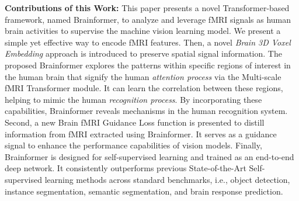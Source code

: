 \noindent
\textbf{Contributions of this Work:} This paper presents a novel Transformer-based framework, named Brainformer, to analyze and leverage fMRI signals as human brain activities to supervise the machine vision learning model. 
We present a simple yet effective way to encode fMRI features. Then, a novel \textit{Brain 3D Voxel Embedding} approach is introduced to preserve spatial signal information. The proposed Brainformer explores the patterns within specific regions of interest in the human brain that signify the human \textit{attention process} via the Multi-scale fMRI Transformer module. It can learn the correlation between these regions, helping to mimic the human \textit{recognition process}. By incorporating these capabilities, Brainformer reveals mechanisms in the human recognition system.
Second, a new Brain fMRI Guidance Loss function is presented to distill information from fMRI extracted using Brainformer. It serves as a guidance signal to enhance the performance capabilities of vision models.
Finally, Brainformer is designed for self-supervised learning and trained as an end-to-end deep network. It consistently outperforms previous State-of-the-Art Self-supervised learning methods across standard benchmarks, i.e., object detection, instance segmentation, semantic segmentation, and brain response prediction.







    


    
    
    


    
    



    
    
    
    
    


    
    
    
    
    


    
    
    

